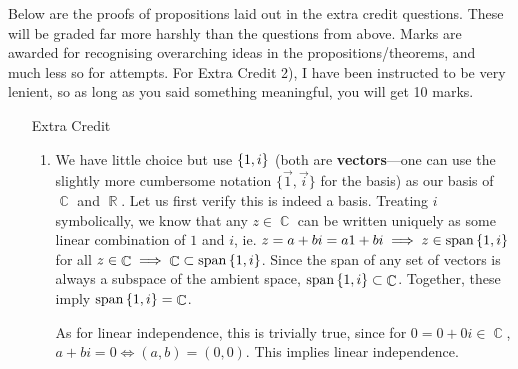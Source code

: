 \documentclass{amsart}
\theoremstyle{definition}
\theoremstyle{definition}
\DeclareMathOperator{\R}{\mathbb{R}}
\DeclareMathOperator{\Com}{\mathbb{C}}
\DeclareMathOperator{\1}{\mathbbm{1}}
\DeclareMathOperator{\Span}{span}
\newcommand{\condset}[4]{\left\{ #1  : \: #2 #3 #4 \right\}}
\begin{document}
	\bigskip %
	
	Below are the proofs of propositions laid out in the extra credit questions. These will be graded far more harshly than the questions from above. Marks are awarded for recognising overarching ideas in the propositions/theorems, and much less so for attempts. For Extra Credit 2), I have been instructed to be very lenient, so as long as you said something meaningful, you will get 10 marks.
	
	\begin{enumerate}
		
		\item[Extra Credit]
%			
	
		\begin{enumerate}[label=\arabic*.]
			\item We have little choice but use $\set{1,i}$ (both are \textbf{vectors}---one can use the slightly more cumbersome notation $\{ \vec{1}, \vec{i} \}$ for the basis) as our basis of $\Com$ and $\R$. Let us first verify this is indeed a basis. Treating $i$ symbolically, we know that any $z \in \Com$ can be written uniquely as some linear combination of $1$ and $i$, ie. $z = a+bi = a1 + bi \implies z \in \Span\set{1,i}$ for all $z \in \Com \implies \Com \subset \Span\set{1,i}$. Since the span of any set of vectors is always a subspace of the ambient space, $\Span \set{1,i} \subset \Com$. Together, these imply $\Span\set{1,i} = \Com$.
			
			\indent As for linear independence, this is trivially true, since for $0 = 0 + 0i \in \Com$, $a+bi = 0 \iff (a,b) = (0,0)$. This implies linear independence.
			

\end{enumerate}
\end{enumerate}
\end{document}
